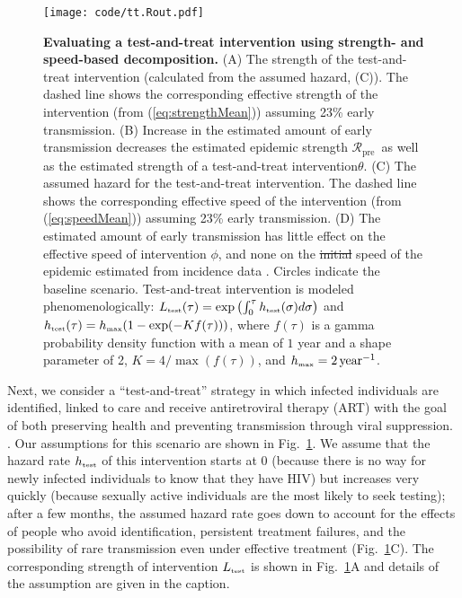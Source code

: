 \documentclass[12pt]{article}
\newcommand{\RR}{\ensuremath{{\mathcal R}}}
\newcommand{\Rx}[1]{\ensuremath{\RR_{\mathrm{#1}}}}
\newcommand{\Rpre}{\Rx{pre}}
\newcommand{\rr}{\ensuremath{{r}}}
\newcommand{\rx}[1]{\ensuremath{\rr_{\mathrm{#1}}}}
\newcommand{\rpre}{\rx{pre}}
\newcommand{\tsub}[2]{#1_{{\textrm{\tiny #2}}}}
\newcommand{\figref}[1]{Fig.~\ref{fig:#1}}
\newcommand{\figlab}[1]{\label{fig:#1}}
\renewcommand{\eqref}[1]{(\ref{eq:#1})} %
\providecommand{\DIFaddtex}[1]{{\protect\color{blue}\uwave{#1}}} %
\providecommand{\DIFdeltex}[1]{{\protect\color{red}\sout{#1}}}                      %
\providecommand{\DIFaddFL}[1]{\DIFadd{#1}} %
\providecommand{\DIFdelFL}[1]{\DIFdel{#1}} %
\providecommand{\DIFaddbeginFL}{} %
\providecommand{\DIFaddendFL}{} %
\providecommand{\DIFdelbeginFL}{} %
\providecommand{\DIFdelendFL}{} %
\providecommand{\DIFadd}[1]{\texorpdfstring{\DIFaddtex{#1}}{#1}} %
\providecommand{\DIFdel}[1]{\texorpdfstring{\DIFdeltex{#1}}{}} %
\newcommand{\DIFscaledelfig}{0.5}
\newlength{\DIFdelgraphicswidth} %
\newlength{\DIFdelgraphicsheight} %
\newcommand{\DIFaddincludegraphics}[2][]{{\color{blue}\fbox{\DIFOincludegraphics[#1]{#2}}}} %
\newcommand{\DIFdelincludegraphics}[2][]{%
\sbox{\DIFdelgraphicsbox}{\DIFOincludegraphics[#1]{#2}}%
\settoboxwidth{\DIFdelgraphicswidth}{\DIFdelgraphicsbox} %
\settoboxtotalheight{\DIFdelgraphicsheight}{\DIFdelgraphicsbox} %
\scalebox{\DIFscaledelfig}{%
\parbox[b]{\DIFdelgraphicswidth}{\usebox{\DIFdelgraphicsbox}\\[-\baselineskip] \rule{\DIFdelgraphicswidth}{0em}}\llap{\resizebox{\DIFdelgraphicswidth}{\DIFdelgraphicsheight}{%
\setlength{\unitlength}{\DIFdelgraphicswidth}%
\begin{picture}(1,1)%
\thicklines\linethickness{2pt} %
{\color[rgb]{1,0,0}\put(0,0){\framebox(1,1){}}}%
{\color[rgb]{1,0,0}\put(0,0){\line( 1,1){1}}}%
{\color[rgb]{1,0,0}\put(0,1){\line(1,-1){1}}}%
\end{picture}%
}\hspace*{3pt}}} %
} %
\DeclareRobustCommand{\DIFaddbeginFL}{\DIFOaddbeginFL \let\includegraphics\DIFaddincludegraphics} %
\DeclareRobustCommand{\DIFaddendFL}{\DIFOaddendFL \let\includegraphics\DIFOincludegraphics} %
\DeclareRobustCommand{\DIFdelbeginFL}{\DIFOdelbeginFL \let\includegraphics\DIFdelincludegraphics} %
\DeclareRobustCommand{\DIFdelendFL}{\DIFOaddendFL \let\includegraphics\DIFOincludegraphics} %
\begin{document}
\begin{figure}[!t]
\texttt{[image: code/tt.Rout.pdf]}
\caption{
\textbf{Evaluating a test-and-treat intervention using strength- and speed-based decomposition.}
(A) The strength of the test-and-treat intervention (calculated from the assumed hazard, (C)). The dashed line shows the corresponding effective strength of the intervention (from \eqref{strengthMean}) assuming 23\% early transmission.
(B) Increase in the estimated amount of early transmission decreases the estimated epidemic strength \DIFdelbeginFL %
\DIFdelendFL \DIFaddbeginFL \Rpre\DIFaddendFL \ as well as the estimated strength \DIFaddbeginFL \DIFaddFL{$\theta$ }\DIFaddendFL of a test-and-treat intervention\DIFdelbeginFL \DIFdelFL{$\theta$}\DIFdelendFL .
(C) The assumed hazard for the test-and-treat intervention. 
The dashed line shows the corresponding effective speed of the intervention (from \eqref{speedMean}) assuming 23\% early transmission.
(D) The estimated amount of early transmission has little effect on the effective speed of intervention $\phi$, and none on the \DIFdelbeginFL \DIFdelFL{initial }\DIFdelendFL \DIFaddbeginFL \DIFaddFL{pre-intervention }\DIFaddendFL speed \DIFaddbeginFL \DIFaddFL{$\rpre$ }\DIFaddendFL of the epidemic estimated from incidence data\DIFdelbeginFL %
\DIFdelendFL .
Circles indicate the baseline scenario.
Test-and-treat intervention is modeled phenomenologically: $\tsub{L}{test}(\tau) = \exp\left(\int_0^\tau \tsub{h}{test}(\sigma) d\sigma \right)$ and \DIFdelbeginFL \DIFdelFL{$\tsub{h}{test}(\tau) = \tsub{h}{max} (1 - \exp(- K f(\tau)))$}\DIFdelendFL \DIFaddbeginFL \DIFaddFL{$\tsub{h}{test}(\tau) = \tsub{h}{max} (1 - \exp(- k f(\tau)))$}\DIFaddendFL , where $f(\tau)$ is a gamma probability density function with a mean of $1$ year and a shape parameter of 2, \DIFdelbeginFL \DIFdelFL{$K = 4/\max(f(\tau))$}\DIFdelendFL \DIFaddbeginFL \DIFaddFL{$k = 4/\max(f(\tau))$}\DIFaddendFL , and $\tsub{h}{max} = 2\,\mathrm{year}^{-1}$.
}
\figlab{test}
\end{figure}

Next, we consider a ``test-and-treat'' strategy in which infected individuals are identified, linked to care and receive antiretroviral therapy (ART) with the goal of both preserving health and preventing transmission through viral suppression. \citep{garnett2009treating, granich2009universal, nah2017test}.
Our assumptions for this scenario are shown in \figref{test}.
We assume that the hazard rate $\tsub{h}{test}$ of this intervention starts at 0 (because there is no way for newly infected individuals to know that they have HIV) but increases very quickly (because sexually active individuals are the most likely to seek testing); 
after a few months, the assumed hazard rate goes down to account for the effects of people who avoid identification, persistent treatment failures, and the possibility of rare transmission even under effective treatment (\figref{test}C). The corresponding strength of intervention $\tsub{L}{test}$ is shown in \figref{test}A and details of the assumption are given in the caption.
\end{document}
